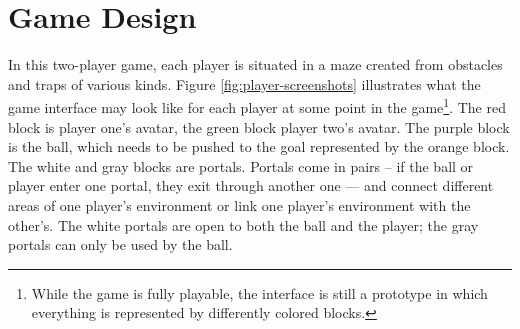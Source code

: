 \section{Game Design}


In this two-player game, each player is situated in a maze created
from obstacles and traps of various kinds.  Figure
\ref{fig:player-screenshots} illustrates what the game interface may
look like for each player at some point in the
game\footnote{While the game is fully playable, the interface is still
  a prototype in which everything is represented by differently
  colored blocks.}. The red block is player one's avatar, the green
block player two's avatar. The purple block is the ball, which needs
to be pushed to the goal represented by the orange block. The white
and gray blocks are portals. Portals come in pairs -- if the ball or
player enter one portal, they exit through another one --- and connect
different areas of one player's environment or link one player's
environment with the other's. The white portals are open to both the
ball and the player; the gray portals can only be used by the ball.


